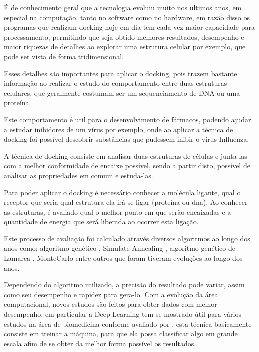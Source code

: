 \documentclass[tcc, capa]{texucpel}
\begin{document}
É de conhecimento geral que a tecnologia evoluiu muito nos ultimos anos, em especial na computação, tanto no software como no hardware,  em razão disso os programas que realizam docking hoje em dia tem cada vez maior capacidade para processamento, permitindo que seja obtido melhores resultados, desempenho e maior riquezas de detalhes ao explorar uma estrutura celular por exemplo, que pode ser vista de forma tridimensional.

Esses detalhes são importantes para aplicar o docking, pois trazem bastante informação ao realizar o estudo do comportamento entre duas estruturas celulares, que geralmente costumam ser um sequenciamento de DNA ou uma proteína.%

Este comportamento é util para o desenvolvimento de fármacos, podendo ajudar a estudar inibidores de um vírus por exemplo,  onde ao aplicar a técnica de docking foi possível descobrir substâncias que pudessem inibir o vírus Influenza\cite{ishikawa2011binding}.

A técnica de docking consiste em analisar duas estruturas de células e junta-las com a melhor conformidade de encaixe possível, sendo a partir disto, possível de analisar as propriedades em comum e estuda-las.

Para poder aplicar o docking é necessário conhecer a molécula ligante, qual o receptor que seria qual estrutura ela irá se ligar (proteína ou dna). Ao conhecer as estruturas, é avaliado qual o melhor ponto em que serão encaixadas e a quantidade de energia que será liberada ao ocorrer esta ligação.

Este processo de avaliação foi calculado através diversos algoritmos ao longo dos anos como; algoritmo genético \cite{holland1975adaptation}, Simulate Annealing \cite{kirkpatrick1984optimization} ,  algoritmo genético de Lamarca \cite{morris1998automated},  MonteCarlo \cite{caflisch1992monte} entre outros que foram tiveram evoluções ao longo dos anos. 

Dependendo do algoritmo utilizado, a precisão do resultado pode variar, assim como seu desempenho e rapidez para gera-lo.
Com a evolução da área computacional, novos estudos são feitos para obter dados com melhor desempenho, em particular a Deep Learning tem se mostrado útil para vários estudos na área de biomedicina conforme avaliado por \cite{korotcov2017comparison,mamoshina2016applications}
, esta técnica basicamente consiste em treinar a máquina, para que ela possa classificar algo em grande escala afim de se obter da melhor forma possível  os resultados.
\end{document}
